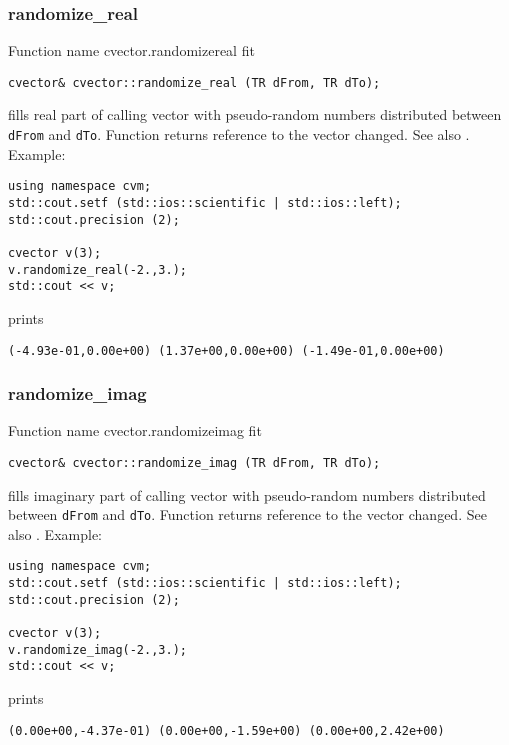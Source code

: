 \subsubsection{randomize\_real}
Function%
\pdfdest name {cvector.randomizereal} fit
\begin{verbatim}
cvector& cvector::randomize_real (TR dFrom, TR dTo);
\end{verbatim}
fills  real part of  calling vector with
pseudo-random numbers distributed between
\verb"dFrom" and \verb"dTo".
Function
returns  reference to the vector changed.
See also
.
Example:
\begin{Verbatim}
using namespace cvm;
std::cout.setf (std::ios::scientific | std::ios::left);
std::cout.precision (2);

cvector v(3);
v.randomize_real(-2.,3.);
std::cout << v;
\end{Verbatim}
prints
\begin{Verbatim}
(-4.93e-01,0.00e+00) (1.37e+00,0.00e+00) (-1.49e-01,0.00e+00)
\end{Verbatim}
\newpage


\subsubsection{randomize\_imag}
Function%
\pdfdest name {cvector.randomizeimag} fit
\begin{verbatim}
cvector& cvector::randomize_imag (TR dFrom, TR dTo);
\end{verbatim}
fills  imaginary part of  calling vector with
pseudo-random numbers distributed between
\verb"dFrom" and \verb"dTo".
Function
returns  reference to the vector changed.
See also
.
Example:
\begin{Verbatim}
using namespace cvm;
std::cout.setf (std::ios::scientific | std::ios::left);
std::cout.precision (2);

cvector v(3);
v.randomize_imag(-2.,3.);
std::cout << v;
\end{Verbatim}
prints
\begin{Verbatim}
(0.00e+00,-4.37e-01) (0.00e+00,-1.59e+00) (0.00e+00,2.42e+00)
\end{Verbatim}
\newpage
